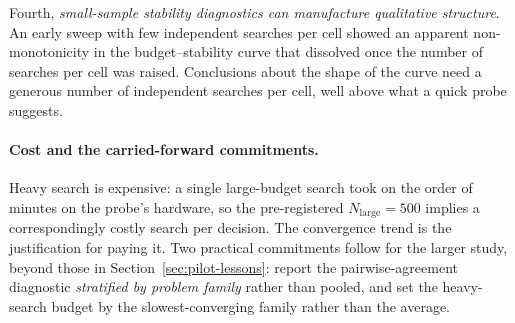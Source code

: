 Fourth, \emph{small-sample stability diagnostics can manufacture qualitative
structure}. An early sweep with few independent searches per cell showed an
apparent non-monotonicity in the budget--stability curve that dissolved once the
number of searches per cell was raised. Conclusions about the shape of the curve
need a generous number of independent searches per cell, well above what a quick
probe suggests.

\paragraph{Cost and the carried-forward commitments.} Heavy search is expensive:
a single large-budget search took on the order of minutes on the probe's
hardware, so the pre-registered $N_{\mathrm{large}} = 500$ implies a
correspondingly costly search per decision. The convergence trend is the
justification for paying it. Two practical commitments follow for the larger
study, beyond those in Section~\ref{sec:pilot-lessons}: report the
pairwise-agreement diagnostic \emph{stratified by problem family} rather than
pooled, and set the heavy-search budget by the slowest-converging family rather
than the average.
